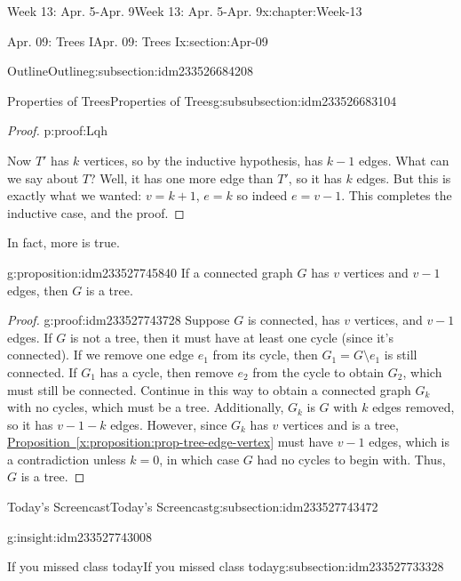 \documentclass[oneside,10pt,]{book}
\newcommand{\xreffont}{\relax}
\numberwithin{equation}{section}
\begin{document}
\begin{chapterptx}{Week 13: Apr. 5-Apr. 9}{}{Week 13: Apr. 5-Apr. 9}{}{}{x:chapter:Week-13}
\begin{sectionptx}{Apr. 09: Trees I}{}{Apr. 09: Trees I}{}{}{x:section:Apr-09}
\begin{subsectionptx}{Outline}{}{Outline}{}{}{g:subsection:idm233526684208}
\begin{subsubsectionptx}{Properties of Trees}{}{Properties of Trees}{}{}{g:subsubsection:idm233526683104}
\begin{proof}{}{p:proof:Lqh}
\par
Now \(T'\) has \(k\) vertices, so by the inductive hypothesis, has \(k-1\) edges.  What can we say about \(T\)?  Well, it has one more edge than \(T'\), so it has \(k\) edges.  But this is exactly what we wanted: \(v=k+1\), \(e=k\) so indeed \(e = v-1\).  This completes the inductive case, and the proof.%
\end{proof}
In fact, more is true.%
\begin{proposition}{}{}{g:proposition:idm233527745840}%
If a connected graph \(G\) has \(v\) vertices and \(v-1\) edges, then \(G\) is a tree.%
\end{proposition}
\begin{proof}{}{g:proof:idm233527743728}
Suppose \(G\) is connected, has \(v\) vertices, and \(v-1\) edges. If \(G\) is not a tree, then it must have at least one cycle (since it's connected). If we remove one edge \(e_1\) from its cycle, then \(G_1 = G\setminus e_1\) is still connected. If \(G_1\) has a cycle, then remove \(e_2\) from the cycle to obtain \(G_2\), which must still be connected. Continue in this way to obtain a connected graph \(G_k\) with no cycles, which must be a tree. Additionally, \(G_k\) is \(G\) with \(k\) edges removed, so it has \(v-1-k\) edges. However, since \(G_k\) has \(v\) vertices and is a tree, \hyperref[x:proposition:prop-tree-edge-vertex]{Proposition~{\xreffont\ref{x:proposition:prop-tree-edge-vertex}}}  must have \(v-1\) edges, which is a contradiction unless \(k=0\), in which case \(G\) had no cycles to begin with. Thus, \(G\) is a tree.%
\end{proof}
\end{subsubsectionptx}
\end{subsectionptx}
%
%
\typeout{************************************************}
\typeout{************************************************}
%
\begin{subsectionptx}{Today's Screencast}{}{Today's Screencast}{}{}{g:subsection:idm233527743472}
\begin{insight}{}{g:insight:idm233527743008}%
\end{insight}
\end{subsectionptx}
%
%
\typeout{************************************************}
\typeout{************************************************}
%
\begin{subsectionptx}{If you missed class today}{}{If you missed class today}{}{}{g:subsection:idm233527733328}

\end{subsectionptx}
\end{sectionptx}
\end{chapterptx}
\end{document}

